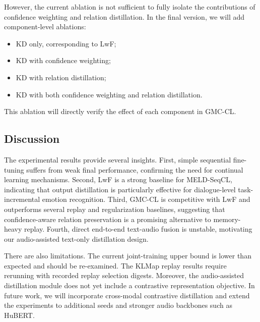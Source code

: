 However, the current ablation is not sufficient to fully isolate the contributions of confidence weighting and relation distillation. In the final version, we will add component-level ablations:
\begin{itemize}
    \item KD only, corresponding to LwF;
    \item KD with confidence weighting;
    \item KD with relation distillation;
    \item KD with both confidence weighting and relation distillation.
\end{itemize}
This ablation will directly verify the effect of each component in GMC-CL.

\subsection{Discussion}
\label{subsec:discussion}

The experimental results provide several insights. First, simple sequential fine-tuning suffers from weak final performance, confirming the need for continual learning mechanisms. Second, LwF is a strong baseline for MELD-SeqCL, indicating that output distillation is particularly effective for dialogue-level task-incremental emotion recognition. Third, GMC-CL is competitive with LwF and outperforms several replay and regularization baselines, suggesting that confidence-aware relation preservation is a promising alternative to memory-heavy replay. Fourth, direct end-to-end text-audio fusion is unstable, motivating our audio-assisted text-only distillation design.

There are also limitations. The current joint-training upper bound is lower than expected and should be re-examined. The KLMap replay results require rerunning with recorded replay selection digests. Moreover, the audio-assisted distillation module does not yet include a contrastive representation objective. In future work, we will incorporate cross-modal contrastive distillation and extend the experiments to additional seeds and stronger audio backbones such as HuBERT.
